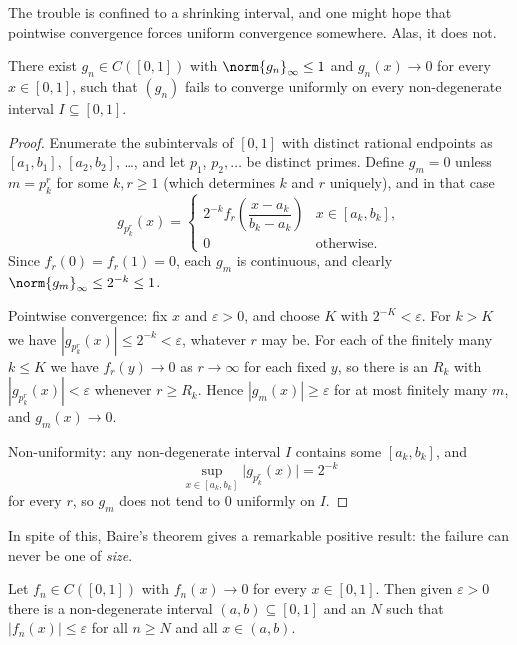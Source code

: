The trouble is confined to a shrinking interval, and one might hope that pointwise convergence forces uniform convergence somewhere. Alas, it does not.

\begin{lemma}\label{lem:no-uniform-anywhere}
	There exist $g_n\in C([0,1])$ with $\norm{g_n}_\infty\leq1$ and $g_n(x)\to0$ for every $x\in[0,1]$, such that $(g_n)$ fails to converge uniformly on every non-degenerate interval $I\subseteq[0,1]$.
\end{lemma}

\begin{proof}
	Enumerate the subintervals of $[0,1]$ with distinct rational endpoints as $[a_1,b_1]$, $[a_2,b_2]$, \ldots, and let $p_1$, $p_2,\ldots$ be distinct primes. Define $g_m = 0$ unless $m = p_k^r$ for some $k,r\geq1$ (which determines $k$ and $r$ uniquely), and in that case
	$$g_{p_k^r}(x) = \begin{cases}2^{-k}f_r\!\left(\dfrac{x-a_k}{b_k-a_k}\right) & x\in[a_k,b_k],\\[4pt] 0 & \text{otherwise.}\end{cases}$$
	Since $f_r(0)=f_r(1)=0$, each $g_m$ is continuous, and clearly $\norm{g_m}_\infty\leq 2^{-k}\leq1$.

	Pointwise convergence: fix $x$ and $\varepsilon>0$, and choose $K$ with $2^{-K}<\varepsilon$. For $k > K$ we have $|g_{p_k^r}(x)|\leq2^{-k}<\varepsilon$, whatever $r$ may be. For each of the finitely many $k\leq K$ we have $f_r(y)\to0$ as $r\to\infty$ for each fixed $y$, so there is an $R_k$ with $|g_{p_k^r}(x)|<\varepsilon$ whenever $r\geq R_k$. Hence $|g_m(x)|\geq\varepsilon$ for at most finitely many $m$, and $g_m(x)\to0$.

	Non-uniformity: any non-degenerate interval $I$ contains some $[a_k,b_k]$, and
	$$\sup_{x\in[a_k,b_k]}\big|g_{p_k^r}(x)\big| = 2^{-k}$$
	for every $r$, so $g_m$ does not tend to $0$ uniformly on $I$.
\end{proof}

In spite of this, Baire's theorem gives a remarkable positive result: the failure can never be one of \emph{size}.

\begin{theorem}[Osgood]\label{thm:osgood}
	Let $f_n\in C([0,1])$ with $f_n(x)\to0$ for every $x\in[0,1]$. Then given $\varepsilon>0$ there is a non-degenerate interval $(a,b)\subseteq[0,1]$ and an $N$ such that $|f_n(x)|\leq\varepsilon$ for all $n\geq N$ and all $x\in(a,b)$.
\end{theorem}

